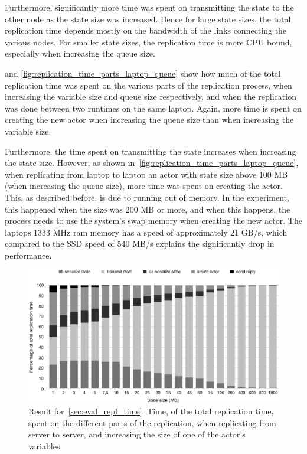 \documentclass{cslthse-msc}
\begin{document}
Furthermore, significantly more time was spent on transmitting the state to the other node as the state size was increased. Hence for large state sizes, the total replication time depends mostly on the bandwidth of the links connecting the various nodes. For smaller state sizes, the replication time is more CPU bound, especially when increasing the queue size.

 and \cref{fig:replication_time_parts_laptop_queue} show how much of the total replication time was spent on the various parts of the replication process, when increasing the variable size and queue size respectively, and when the replication was done between two runtimes on the same laptop. Again, more time is spent on creating the new actor when increasing the queue size than when increasing the variable size. %

Furthermore, the time spent on transmitting the state increases when increasing the state size. However, as shown in~\cref{fig:replication_time_parts_laptop_queue}, when replicating from laptop to laptop an actor with state size above 100 MB (when increasing the queue size), more time was spent on creating the actor. This, as described before, is due to running out of memory. In the experiment, this happened when the size was 200 MB or more, and when this happens, the process needs to use the system's swap memory when creating the new actor. The laptops 1333 MHz ram memory has a speed of approximately 21 GB/s, which compared to the SSD speed of 540 MB/s explains the significantly drop in performance.

\begin{figure}[hbt!]
\centering
\includegraphics[scale=0.5]{images/results/replication_time/server_parts_variable.pdf} 
\caption[Replication time parts in~\cref{sec:eval_repl_time}, server-server, increasing variable size]{Result for~\cref{sec:eval_repl_time}. Time, of the total replication time, spent on the different parts of the replication, when replicating from server to server, and increasing the size of one of the actor's variables.} \label{fig:replication_time_parts_server_variable}
\end{figure}
\end{document}
